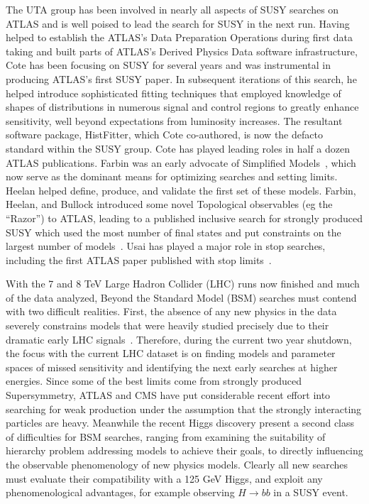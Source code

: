 The UTA group has been involved in nearly all aspects of SUSY searches
on ATLAS and is well poised to lead the search for SUSY in the next
run.  Having helped to establish the ATLAS's Data Preparation
Operations during first data taking and built parts of ATLAS's Derived
Physics Data software infrastructure, Cote has been focusing on SUSY
for several years and was instrumental in producing ATLAS's first SUSY
paper\cite{Aad:2011hh}. In subsequent iterations of this search, he helped
introduce sophisticated fitting techniques that employed knowledge of
shapes of distributions in numerous signal and control regions to
greatly enhance sensitivity, well beyond expectations from luminosity
increases\cite{ATLAS:2011ad}. The resultant software package, HistFitter,
which Cote co-authored, is now the defacto standard within the SUSY
group. Cote has played leading roles in half a dozen ATLAS
publications. Farbin was an early advocate of 
Simplified Models~\cite{LPCC}, which
now serve as the dominant means for optimizing searches and setting
limits.  Heelan helped define, produce, and validate the first set of
these models. Farbin, Heelan, and Bullock introduced some novel
Topological observables (eg the ``Razor'') to ATLAS, leading to a
published inclusive search for strongly produced SUSY which used the
most number of final states and put constraints on the largest number
of models~\cite{ATLASRazorPaper}.  Usai has played a major role in stop searches,
including the first ATLAS paper published with stop
limits~\cite{Aad:2012uu}.


With the 7 and 8 TeV Large Hadron Collider (LHC) runs now finished and
much of the data analyzed, Beyond the Standard Model (BSM) searches
must contend with two difficult realities. First, the absence of any
new physics in the data severely constrains models that were heavily
studied precisely due to their dramatic early LHC
signals~\cite{BSMLimitSummary}. Therefore, during the current two year
shutdown, the focus with the current LHC dataset is on finding models
and parameter spaces of missed sensitivity and identifying the next
early searches at higher energies. Since some of the best limits come
from strongly produced Supersymmetry, ATLAS and CMS have put
considerable recent effort into searching for weak production under
the assumption that the strongly interacting particles are
heavy. Meanwhile the recent Higgs discovery present a second class of
difficulties for BSM searches, ranging from examining the suitability
of hierarchy problem addressing models to achieve their goals, to
directly influencing the observable phenomenology of new physics
models. Clearly all new searches must evaluate their compatibility
with a 125 GeV Higgs, and exploit any phenomenological advantages, for
example observing $H\rightarrow bb$ in a SUSY event.

